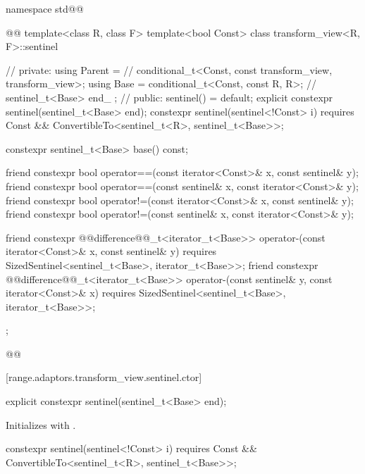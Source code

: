 \begin{codeblock}
namespace std@@ { @@
  template<class R, class F>
  template<bool Const>
  class transform_view<R, F>::sentinel { // \expos
  private:
    using Parent =                                 // \expos
      conditional_t<Const, const transform_view, transform_view>;
    using Base = conditional_t<Const, const R, R>; // \expos
    sentinel_t<Base> end_ {};                      // \expos
  public:
    sentinel() = default;
    explicit constexpr sentinel(sentinel_t<Base> end);
    constexpr sentinel(sentinel<!Const> i)
      requires Const && ConvertibleTo<sentinel_t<R>, sentinel_t<Base>>;

    constexpr sentinel_t<Base> base() const;

    friend constexpr bool operator==(const iterator<Const>& x, const sentinel& y);
    friend constexpr bool operator==(const sentinel& x, const iterator<Const>& y);
    friend constexpr bool operator!=(const iterator<Const>& x, const sentinel& y);
    friend constexpr bool operator!=(const sentinel& x, const iterator<Const>& y);

    friend constexpr @@difference@@_t<iterator_t<Base>>
      operator-(const iterator<Const>& x, const sentinel& y)
        requires SizedSentinel<sentinel_t<Base>, iterator_t<Base>>;
    friend constexpr @@difference@@_t<iterator_t<Base>>
      operator-(const sentinel& y, const iterator<Const>& x)
        requires SizedSentinel<sentinel_t<Base>, iterator_t<Base>>;
  };
}@\oldtxt{\}}@
\end{codeblock}

[range.adaptors.transform_view.sentinel.ctor]{}

\begin{itemdecl}
explicit constexpr sentinel(sentinel_t<Base> end);
\end{itemdecl}

\begin{itemdescr}
\pnum
\effects Initializes  with .
\end{itemdescr}

\begin{itemdecl}
constexpr sentinel(sentinel<!Const> i)
  requires Const && ConvertibleTo<sentinel_t<R>, sentinel_t<Base>>;
\end{itemdecl}


